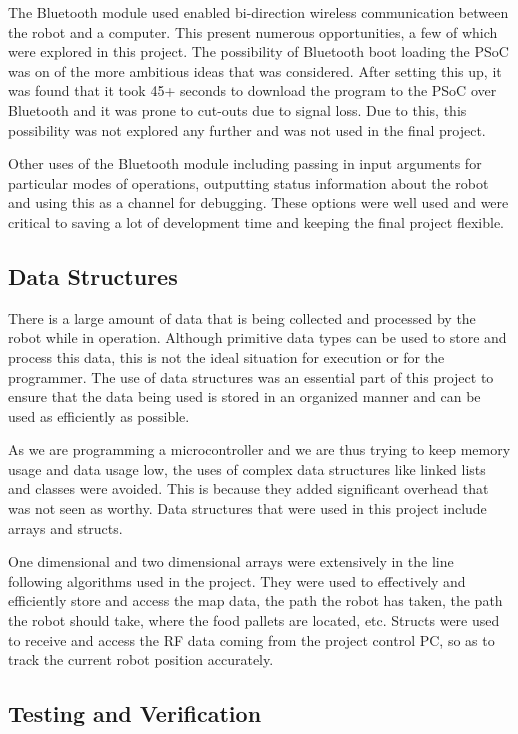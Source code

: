 \documentclass{article}
\begin{document}
The Bluetooth module used enabled bi-direction wireless communication between the robot and a computer. This present numerous opportunities, a few of which were explored in this project. The possibility of Bluetooth boot loading the PSoC was on of the more ambitious ideas that was considered. After setting this up, it was found that it took 45+ seconds to download the program to the PSoC over Bluetooth and it was prone to cut-outs due to signal loss. Due to this, this possibility was not explored any further and was not used in the final project.

Other uses of the Bluetooth module including passing in input arguments for particular modes of operations, outputting status information about the robot and using this as a channel for debugging. These options were well used and were critical to saving a lot of development time and keeping the final project flexible.

\subsection{Data Structures}

There is a large amount of data that is being collected and processed by the robot while in operation. Although primitive data types can be used to store and process this data, this is not the ideal situation for execution or for the programmer. The use of data structures was an essential part of this project to ensure that the data being used is stored in an organized manner and can be used as efficiently as possible. 

As we are programming a microcontroller and we are thus trying to keep memory usage and data usage low, the uses of complex data structures like linked lists and classes were avoided. This is because they added significant overhead that was not seen as worthy. Data structures that were used in this project include arrays and structs.

One dimensional and two dimensional arrays were extensively in the line following algorithms used in the project. They were used to effectively and efficiently store and access the map data, the path the robot has taken, the path the robot should take, where the food pallets are located, etc. Structs were used to receive and access the RF data coming from the project control PC, so as to track the current robot position accurately.

\subsection{Testing and Verification}
\end{document}
